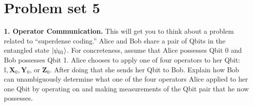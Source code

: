 \documentclass{book}
\theoremstyle{definition}
\newcommand{\X}{\mathbf{X}}
\newcommand{\Id}{\mathbb{I}}
\newcommand{\Z}{\mathbf{Z}}
\newcommand{\Y}{\mathbf{Y}}
\begin{document}
\newpage

















\section{Problem set 5}










\noindent \textbf{1. Operator Communication.} This will get you to think about a problem related to ``superdense coding.'' Alice and Bob share a pair of Qbits in the entangled state $\ket{\psi_{01}}$. For
concreteness, assume that Alice possesses Qbit 0 and Bob possesses Qbit 1. Alice chooses to
apply one of four operators to her Qbit: $\Id, \X_0, \Y_0$, or $\Z_0$. After doing that she sends her
Qbit to Bob. Explain how Bob can unambiguously determine what one of the four operators
Alice applied to her one Qbit by operating on and making measurements of the Qbit pair
that he now possesses.\\
\end{document}

